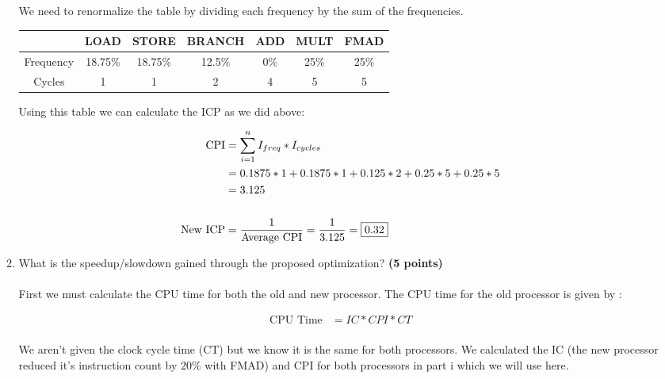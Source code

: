 \documentclass[a4paper, 15pt]{exam}
\begin{document}
\begin{enumerate}
\begin{enumerate}
\begin{center}
\begin{tabular}{ |c|c|c|c|c|c|c| }
\hline
\end{tabular}
\end{center}

We need to renormalize the table by dividing each frequency by the sum of the frequencies.

   	   \begin{center}
\begin{tabular}{ |c|c|c|c|c|c|c| } 
 \hline
  & LOAD & STORE & BRANCH & ADD & MULT & FMAD \\ 
  \hline
 Frequency & 18.75\% & 18.75\% & 12.5\% & 0\% & 25\% & 25\% \\ \hline
 Cycles & 1 & 1 & 2 &4 & 5 & 5\\ 

\hline
\end{tabular}
\end{center}

Using this table we can calculate the ICP as we did above:

   \begin{align*} 
   			\text{CPI} &= \sum_{i = 1}^n I_{freq} * I_{cycles} \\
   			  			&= 0.1875 * 1 + 0.1875 * 1 + 0.125 * 2 + 0.25 * 5 + 0.25 * 5 \\
   			  			&= 3.125 \\ \\
   			  			\text{New ICP} &= \frac{1}{\text{Average CPI}} = \frac{1}{3.125} = \fbox{0.32}
   	\end{align*}
   	
    \item What is the speedup/slowdown gained through the proposed optimization?  \textbf{(5 points)} \\ \\
   First we must calculate the CPU time for both the old and new processor. The CPU time for the old processor is given by :
   
   \begin{align*} 
   			\text{CPU Time} &= IC * CPI * CT \\
   	\end{align*}
   	
   	We aren't given the clock cycle time (CT) but we know it is the same for both processors. We calculated the IC (the new processor reduced it's instruction count by $20\%$ with FMAD) and CPI for both processors in part i which we will use here.
   	

\end{enumerate}
\end{enumerate}
\end{document}
